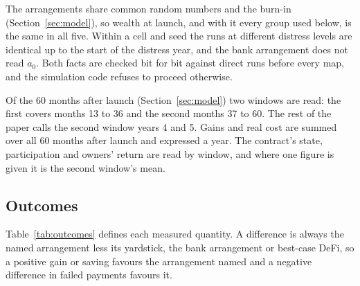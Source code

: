 The arrangements share common random numbers and the burn-in (Section~\ref{sec:model}), so wealth at launch, and
with it every group used below, is the same in all five.
Within a cell and seed the runs at different distress levels are identical up to the start of the distress year,
and the bank arrangement does not read $a_{0}$. Both facts are checked bit for bit against direct runs before
every map, and the simulation code refuses to proceed otherwise.

Of the 60 months after launch (Section~\ref{sec:model}) two windows are read: the first covers months 13 to 36
and the second months 37 to 60. The rest of the paper calls the second window years 4 and 5. Gains and real cost
are summed over all 60 months after launch and expressed a year. The contract's state, participation and owners' return are read by
window, and where one figure is given it is the second window's mean.

\subsection{Outcomes}

Table~\ref{tab:outcomes} defines each measured quantity. A difference is always the named arrangement less its
yardstick, the bank arrangement or best-case DeFi, so a positive gain or saving favours the arrangement
named and a negative difference in failed payments favours it.

